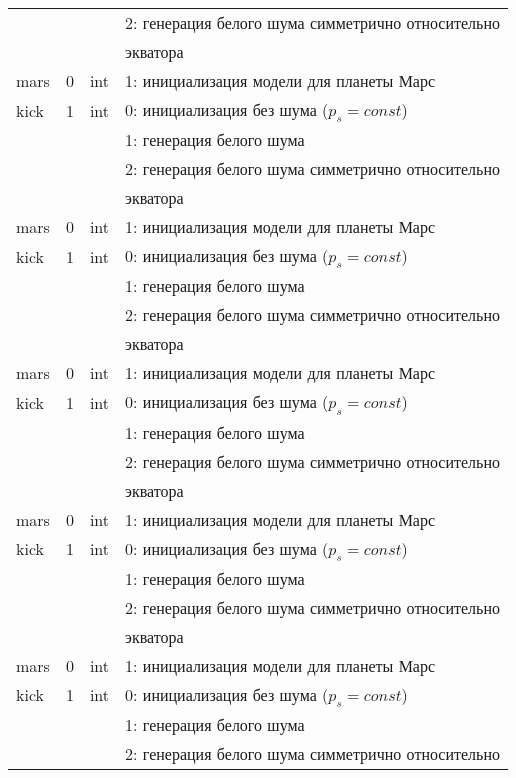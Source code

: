 \begin{longtable}[c]{|l|c|l|l|}
          &   &     & 2: генерация белого шума симметрично относительно \\
      & & & экватора    \\
     mars & 0 & int & 1: инициализация модели для планеты Марс     \\
    kick & 1 & int & 0: инициализация без шума (\(p_s = const\)) \\
          &   &     & 1: генерация белого шума                  \\
          &   &     & 2: генерация белого шума симметрично относительно \\
      & & & экватора    \\
     mars & 0 & int & 1: инициализация модели для планеты Марс     \\
    kick & 1 & int & 0: инициализация без шума (\(p_s = const\)) \\
          &   &     & 1: генерация белого шума                  \\
          &   &     & 2: генерация белого шума симметрично относительно \\
      & & & экватора    \\
     mars & 0 & int & 1: инициализация модели для планеты Марс     \\
    kick & 1 & int & 0: инициализация без шума (\(p_s = const\)) \\
          &   &     & 1: генерация белого шума                  \\
          &   &     & 2: генерация белого шума симметрично относительно \\
      & & & экватора    \\
     mars & 0 & int & 1: инициализация модели для планеты Марс     \\
    kick & 1 & int & 0: инициализация без шума (\(p_s = const\)) \\
          &   &     & 1: генерация белого шума                  \\
          &   &     & 2: генерация белого шума симметрично относительно \\
      & & & экватора    \\
     mars & 0 & int & 1: инициализация модели для планеты Марс     \\
    kick & 1 & int & 0: инициализация без шума (\(p_s = const\)) \\
          &   &     & 1: генерация белого шума                  \\
          &   &     & 2: генерация белого шума симметрично относительно \\

\end{longtable}
